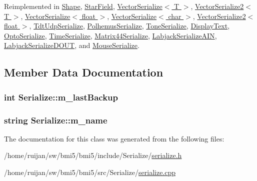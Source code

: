 Reimplemented in \hyperlink{classShape_aaf3b0b140fcaf0bb11c28493ef745bfd}{Shape}, \hyperlink{classStarField_a047f987e052fc14fd8041658c153e0f1}{Star\-Field}, \hyperlink{classVectorSerialize_a929f94f68d0a99c61308520a679ae1a2}{Vector\-Serialize$<$ T $>$}, \hyperlink{classVectorSerialize2_ae0a636c3231b336b7dc8a9b2958b6b0e}{Vector\-Serialize2$<$ T $>$}, \hyperlink{classVectorSerialize_a929f94f68d0a99c61308520a679ae1a2}{Vector\-Serialize$<$ float $>$}, \hyperlink{classVectorSerialize_a929f94f68d0a99c61308520a679ae1a2}{Vector\-Serialize$<$ char $>$}, \hyperlink{classVectorSerialize2_ae0a636c3231b336b7dc8a9b2958b6b0e}{Vector\-Serialize2$<$ float $>$}, \hyperlink{classTdtUdpSerialize_aadd92c08f9323862f7f166a9e2cfaa83}{Tdt\-Udp\-Serialize}, \hyperlink{classPolhemusSerialize_a9f6cdf8427769c6e23ab2afc7cab07ce}{Polhemus\-Serialize}, \hyperlink{classToneSerialize_a4ae952e04b0a89ba3d5a8cb82460b064}{Tone\-Serialize}, \hyperlink{classDisplayText_af663118f6d5010d2d1d45f2bf3680dfc}{Display\-Text}, \hyperlink{classOptoSerialize_a6a29e96b87575f2906b65be40c38ceb2}{Opto\-Serialize}, \hyperlink{classTimeSerialize_aee9a422ba150037d03eaac84f98bb74a}{Time\-Serialize}, \hyperlink{classMatrix44Serialize_a1262b03de3cf08dab616bdb44b354d3d}{Matrix44\-Serialize}, \hyperlink{classLabjackSerializeAIN_a8ff8a30e23acb11137baab14e47b1d4a}{Labjack\-Serialize\-A\-I\-N}, \hyperlink{classLabjackSerializeDOUT_a814b35d1f45892f684767461d1e8c8a7}{Labjack\-Serialize\-D\-O\-U\-T}, and \hyperlink{classMouseSerialize_a93bdbce909f27855fd2e8eb6edbf75a0}{Mouse\-Serialize}.



\subsection{Member Data Documentation}
\hypertarget{classSerialize_a011cc1272d6018ef424f11b33b652019}{
\subsubsection[{m\-\_\-last\-Backup}]{\setlength{\rightskip}{0pt plus 5cm}int Serialize\-::m\-\_\-last\-Backup}}\label{classSerialize_a011cc1272d6018ef424f11b33b652019}
\hypertarget{classSerialize_a9fdb3475fed69e393e8421a21a22a241}{
\subsubsection[{m\-\_\-name}]{\setlength{\rightskip}{0pt plus 5cm}string Serialize\-::m\-\_\-name}}\label{classSerialize_a9fdb3475fed69e393e8421a21a22a241}


The documentation for this class was generated from the following files\-:\begin{DoxyCompactItemize}
\item 
/home/ruijan/sw/bmi5/bmi5/include/\-Serialize/\hyperlink{serialize_8h}{serialize.\-h}\item 
/home/ruijan/sw/bmi5/bmi5/src/\-Serialize/\hyperlink{serialize_8cpp}{serialize.\-cpp}\end{DoxyCompactItemize}
